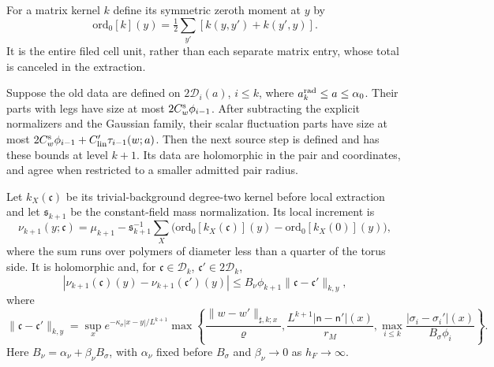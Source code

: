 \documentclass[11pt,letterpaper,reqno]{amsart}
\makeatletter
\theoremstyle{definition}
\newcommand{\ms@minorstart}{%
  \pushQED{\qed}\renewcommand{\qedsymbol}{$\blacksquare$}}
\newenvironment{proposition}[1][]{\ms@minorstart\ms@proposition[#1]}
  {\popQED\endms@proposition}
\theoremstyle{remark}
\makeatother
\begin{document}
For a matrix kernel $k$ define its symmetric zeroth moment at $y$ by
\[
 \mathrm{ord}_0[k](y)=\tfrac12\sum_{y'}[k(y,y')+k(y',y)].
\]
It is the entire filed cell unit, rather than each separate
matrix entry, whose total is canceled in the extraction.

\begin{proposition}[One step at the sources]\label{C-407-16}
Suppose the old data are defined on $2\mathscr D_i(a)$,
$i\le k$, where $a_k^{\rm rad}\le a\le\alpha_0$.
Their parts with legs have size at most
$2C_w^{\rm s}\phi_{i-1}$. After subtracting the explicit
normalizers and the Gaussian family, their scalar
fluctuation parts have size at most
$2C_w^{\rm s}\phi_{i-1}+C'_{\rm lin}\tau_{i-1}(w;a)$.
Then the next source step is defined and has these bounds
at level $k+1$. Its data are holomorphic in the pair and
coordinates, and agree when restricted to a smaller
admitted pair radius.

Let $k_X(\mathfrak c)$ be its trivial-background degree-two
kernel before local extraction and let $\mathfrak s_{k+1}$
be the constant-field mass normalization. Its local increment is
\begin{equation}\label{eq:qcd-source-increment}
 \nu_{k+1}(y;\mathfrak c)=\mu_{k+1}
 -\mathfrak s_{k+1}^{-1}\sum_X
 \bigl(\mathrm{ord}_0[k_X(\mathfrak c)](y)
                 -\mathrm{ord}_0[k_X(0)](y)\bigr),
\end{equation}
where the sum runs over polymers of diameter less than a quarter
of the torus side. It is holomorphic and, for
$\mathfrak c\in\mathscr D_k$, $\mathfrak c'\in2\mathscr D_k$,
\begin{equation}\label{eq:qcd-increment-locality}
 |\nu_{k+1}(\mathfrak c)(y)-\nu_{k+1}(\mathfrak c')(y)|
 \le B_\nu\phi_{k+1}\|\mathfrak c-\mathfrak c'\|_{k,y},
\end{equation}
where
\[
 \|\mathfrak c-\mathfrak c'\|_{k,y}=
 \sup_xe^{-\kappa_\sigma|x-y|/L^{k+1}}
 \max\left\{\frac{\|w-w'\|_{\sharp,k;x}}\varrho,
 \frac{L^{k+1}|\mathsf n-\mathsf n'|(x)}{r_M},
 \max_{i\le k}\frac{|\sigma_i-\sigma_i'|(x)}{B_\sigma\phi_i}\right\}.
\]
Here $B_\nu=\alpha_\nu+\beta_\nu B_\sigma$, with
$\alpha_\nu$ fixed before $B_\sigma$ and $\beta_\nu\to0$
as $h_F\to\infty$.
\end{proposition}
\end{document}
